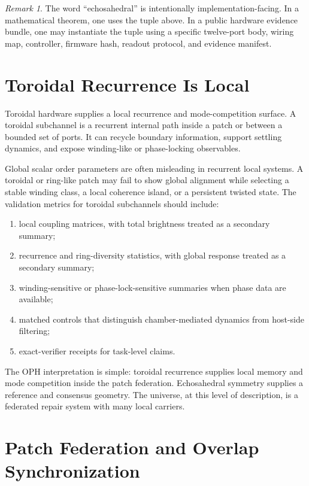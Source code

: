 \documentclass[11pt]{article}
\theoremstyle{remark}
\newtheorem{remark}[theorem]{Remark}
\theoremstyle{plain}
\begin{document}
\begin{remark}
The word ``echosahedral'' is intentionally implementation-facing. In a mathematical theorem, one
uses the tuple above. In a public hardware evidence bundle, one may instantiate the tuple using a
specific twelve-port body, wiring map, controller, firmware hash, readout protocol, and evidence
manifest.
\end{remark}

\section{Toroidal Recurrence Is Local}

Toroidal hardware supplies a local recurrence and mode-competition surface. A toroidal subchannel
is a recurrent internal path inside a patch or between a bounded set of
ports. It can recycle boundary information, support settling dynamics, and expose winding-like
or phase-locking observables.

Global scalar order parameters are often misleading in recurrent local systems. A toroidal or
ring-like patch may fail to show global alignment while selecting a stable winding class, a local
coherence island, or a persistent twisted state. The validation metrics for toroidal subchannels
should include:
\begin{enumerate}[leftmargin=2em]
\item local coupling matrices, with total brightness treated as a secondary summary;
\item recurrence and ring-diversity statistics, with global response treated as a secondary summary;
\item winding-sensitive or phase-lock-sensitive summaries when phase data are available;
\item matched controls that distinguish chamber-mediated dynamics from host-side filtering;
\item exact-verifier receipts for task-level claims.
\end{enumerate}

The OPH interpretation is simple: toroidal recurrence supplies local memory and mode competition
inside the patch federation. Echosahedral symmetry supplies a reference and consensus geometry.
The universe, at this level of description, is a federated repair system with many local carriers.

\section{Patch Federation and Overlap Synchronization}
\end{document}

